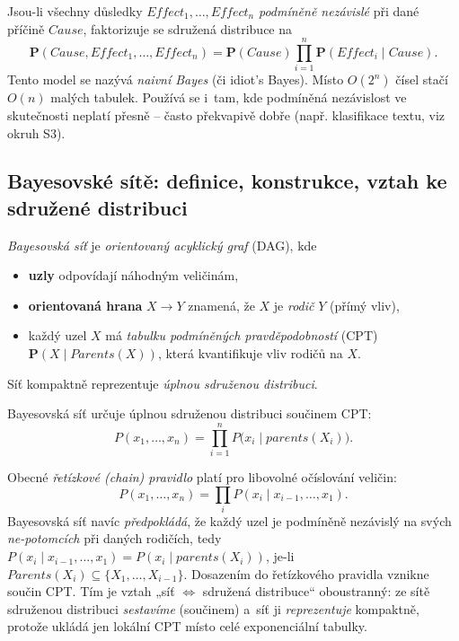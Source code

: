 \begin{definice}
Jsou-li všechny důsledky $Effect_1,\dots,Effect_n$ \emph{podmíněně nezávislé} při dané příčině $Cause$, faktorizuje se sdružená distribuce na
\[ \mathbf{P}(Cause,Effect_1,\dots,Effect_n)=\mathbf{P}(Cause)\prod_{i=1}^{n}\mathbf{P}(Effect_i\mid Cause). \]
Tento model se nazývá \emph{naivní Bayes} (či idiot's Bayes). Místo $O(2^{n})$ čísel stačí $O(n)$ malých tabulek. Používá se i~tam, kde podmíněná nezávislost ve skutečnosti neplatí přesně -- často překvapivě dobře (např. klasifikace textu, viz okruh S3).
\end{definice}

\subsection{Bayesovské sítě: definice, konstrukce, vztah ke sdružené distribuci}

\begin{definice}
\emph{Bayesovská síť} je \emph{orientovaný acyklický graf} (DAG), kde
\begin{itemize}
  \item \textbf{uzly} odpovídají náhodným veličinám,
  \item \textbf{orientovaná hrana} $X\to Y$ znamená, že $X$ je \emph{rodič} $Y$ (přímý vliv),
  \item každý uzel $X$ má \emph{tabulku podmíněných pravděpodobností} (CPT) $\mathbf{P}(X\mid \mathit{Parents}(X))$, která kvantifikuje vliv rodičů na $X$.
\end{itemize}
Síť kompaktně reprezentuje \emph{úplnou sdruženou distribuci}.
\end{definice}

\begin{veta}
Bayesovská síť určuje úplnou sdruženou distribuci součinem CPT:
\[ P(x_1,\dots,x_n)=\prod_{i=1}^{n} P\big(x_i\mid \mathit{parents}(X_i)\big). \]
\end{veta}

\begin{intuice}
Obecné \emph{řetízkové (chain) pravidlo} platí pro libovolné očíslování veličin:
\[ P(x_1,\dots,x_n)=\prod_i P(x_i\mid x_{i-1},\dots,x_1). \]
Bayesovská síť navíc \emph{předpokládá}, že každý uzel je podmíněně nezávislý na svých \emph{ne-potomcích} při daných rodičích, tedy $P(x_i\mid x_{i-1},\dots,x_1)=P(x_i\mid \mathit{parents}(X_i))$, je-li $\mathit{Parents}(X_i)\subseteq\{X_1,\dots,X_{i-1}\}$. Dosazením do řetízkového pravidla vznikne součin CPT. Tím je vztah „síť $\Leftrightarrow$ sdružená distribuce`` oboustranný: ze sítě sdruženou distribuci \emph{sestavíme} (součinem) a~síť ji \emph{reprezentuje} kompaktně, protože ukládá jen lokální CPT místo celé exponenciální tabulky.
\end{intuice}

